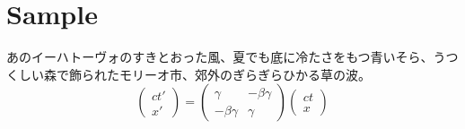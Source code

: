 \documentclass{ltjsarticle}
\begin{document}
\section{Sample}
あのイーハトーヴォのすきとおった風、夏でも底に冷たさをもつ青いそら、うつくしい森で飾られたモリーオ市、郊外のぎらぎらひかる草の波。
\begin{equation*}
    \begin{pmatrix}
        ct' \\
        x'
    \end{pmatrix} 
    =
    \begin{pmatrix}
        \gamma & -\beta \gamma \\
        -\beta \gamma & \gamma
    \end{pmatrix}
    \begin{pmatrix}
        ct \\
        x
    \end{pmatrix}
\end{equation*}
\end{document}
